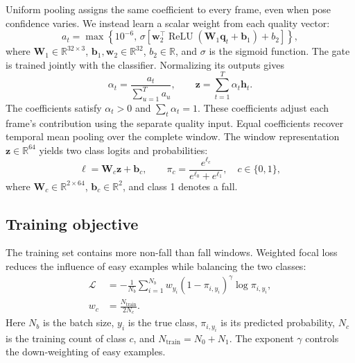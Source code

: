 Uniform pooling assigns the same coefficient to every frame, even when pose confidence varies. We instead learn a scalar weight from each quality vector:
\begin{equation}
    a_t=\max\!\left\{10^{-6},\,
    \sigma\!\left[\mathbf w_2^\top\operatorname{ReLU}
    (\mathbf W_1\mathbf q_t+\mathbf b_1)+b_2\right]\right\},
    \label{eq:quality_gate}
\end{equation}
where $\mathbf W_1\in\mathbb R^{32\times3}$, $\mathbf b_1,\mathbf w_2\in\mathbb R^{32}$, $b_2\in\mathbb R$, and $\sigma$ is the sigmoid function. The gate is trained jointly with the classifier. Normalizing its outputs gives
\begin{equation}
    \alpha_t=\frac{a_t}{\sum_{u=1}^{T}a_u},\qquad
    \mathbf z=\sum_{t=1}^{T}\alpha_t\mathbf h_t.
    \label{eq:quality_pooling}
\end{equation}
The coefficients satisfy $\alpha_t>0$ and $\sum_t\alpha_t=1$. These coefficients adjust each frame's contribution using the separate quality input. Equal coefficients recover temporal mean pooling over the complete window. The window representation $\mathbf z\in\mathbb R^{64}$ yields two class logits and probabilities:
\begin{equation}
    \boldsymbol\ell=\mathbf W_c\mathbf z+\mathbf b_c,\qquad
    \pi_c=\frac{e^{\ell_c}}{e^{\ell_0}+e^{\ell_1}},\quad c\in\{0,1\},
    \label{eq:classification_probability}
\end{equation}
where $\mathbf W_c\in\mathbb R^{2\times64}$, $\mathbf b_c\in\mathbb R^2$, and class 1 denotes a fall.

\subsection{Training objective}

The training set contains more non-fall than fall windows. Weighted focal loss~\cite{lin2017focal} reduces the influence of easy examples while balancing the two classes:
\begin{equation}
    \begin{aligned}
        \mathcal L&=-\frac{1}{N_b}\sum_{i=1}^{N_b}
        w_{y_i}(1-\pi_{i,y_i})^{\gamma}\log\pi_{i,y_i},\\
        w_c&=\frac{N_{\mathrm{train}}}{2N_c}.
    \end{aligned}
    \label{eq:focal_loss}
\end{equation}
Here $N_b$ is the batch size, $y_i$ is the true class, $\pi_{i,y_i}$ is its predicted probability, $N_c$ is the training count of class $c$, and $N_{\mathrm{train}}=N_0+N_1$. The exponent $\gamma$ controls the down-weighting of easy examples.
